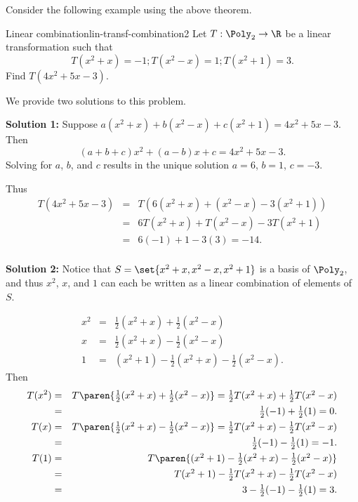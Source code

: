 Consider the following example using the above theorem. 

\begin{example}{Linear combination}{lin-transf-combination2}
Let $T:\Poly_2 \to \R$ be a linear transformation such that
\[ T(x^2+x)=-1; T(x^2-x)=1; T(x^2+1)=3.\]
Find $T(4x^2+5x-3)$.
\end{example}

\begin{solution}
We provide two solutions to this problem.

\textbf{Solution 1:}
Suppose
$a(x^2+x) + b(x^2-x) + c(x^2+1) = 4x^2+5x-3$. 
Then
\[ (a+b+c)x^2 + (a-b)x + c = 4x^2+5x-3.\]
Solving for $a$, $b$, and $c$ results in the unique solution
$a=6$, $b=1$, $c=-3$.

Thus
\begin{eqnarray*}
T(4x^2+5x-3) & = & T(6(x^2+x) + (x^2-x) -3(x^2+1)) \\
& = & 6T(x^2+x) + T(x^2-x) -3T(x^2+1) \\
& = & 6(-1) + 1 -3(3) = -14. \\
\end{eqnarray*}

\textbf{Solution 2:}
Notice that
$S=\set{x^2+x, x^2-x, x^2+1}$ is a basis of $\Poly_2$, and
thus $x^2$, $x$, and $1$ can each be written as a linear 
combination of elements of $S$.

\begin{eqnarray*}
x^2 & = & \textstyle \frac{1}{2}(x^2+x) + \frac{1}{2}(x^2-x) \\
x & = & \textstyle \frac{1}{2}(x^2+x) - \frac{1}{2}(x^2-x) \\
1 & = & (x^2+1)-\textstyle \frac{1}{2}(x^2+x) - \frac{1}{2}(x^2-x).
\end{eqnarray*}
Then
\begin{eqnarray*}
T(x^2) & = & \textstyle T\paren{\frac{1}{2}(x^2+x) + \frac{1}{2}(x^2-x)}
=\frac{1}{2}T(x^2+x) + \frac{1}{2}T(x^2-x)\\
& = & \textstyle \frac{1}{2}(-1) + \frac{1}{2}(1) = 0.  \\
T(x) & = & \textstyle T\paren{\frac{1}{2}(x^2+x) - \frac{1}{2}(x^2-x)}
= \frac{1}{2}T(x^2+x) - \frac{1}{2}T(x^2-x) \\
& = & \textstyle \frac{1}{2}(-1) - \frac{1}{2}(1) = -1.\\
T(1) & = & \textstyle T\paren{(x^2+1)-\frac{1}{2}(x^2+x) -
\frac{1}{2}(x^2-x)}\\
& = & \textstyle T(x^2+1)-\frac{1}{2}T(x^2+x) - \frac{1}{2}T(x^2-x) \\
& = & \textstyle 3-\frac{1}{2}(-1) - \frac{1}{2}(1) = 3.
\end{eqnarray*}


\end{solution}
